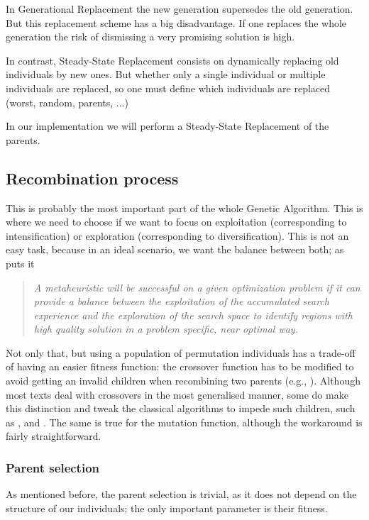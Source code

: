 In Generational Replacement the new generation supersedes the old generation. But this replacement scheme has a big disadvantage. If one replaces the whole generation the risk of dismissing a very promising solution is high.

In contrast, Steady-State Replacement consists on dynamically replacing old individuals by new ones. But whether only a single individual or multiple individuals are replaced,  so one must define which individuals are replaced (worst, random, parents, ...)

\bigskip
In our implementation we will perform a Steady-State Replacement of the parents.

\subsection{Recombination process}\label{sec:recombination}
This is probably the most important part of the whole Genetic Algorithm. This is where we need to choose if we want to focus on exploitation (corresponding to intensification) or exploration (corresponding to diversification). This is not an easy task, because in an ideal scenario, we want the balance between both; as \textcite{Stutzle1999} puts it
\begin{quotation}
	\emph{A metaheuristic will be successful on a given optimization problem if it can provide a balance between the exploitation of the accumulated search experience and the exploration of the search space to identify regions with high quality solution in a problem specific, near optimal way.}
\end{quotation}

Not only that, but using a population of permutation individuals has a trade-off of having an easier fitness function: the crossover function has to be modified to avoid getting an invalid children when recombining two parents (e.g., \inline{[1 1 0 3]}). Although most texts deal with crossovers in the most generalised manner, some do make this distinction and tweak the classical algorithms to impede such children, such as \textcite{Gendreau2010}, and \textcite{Goldberg1989}. The same is true for the mutation function, although the workaround is fairly straightforward.

\subsubsection*{Parent selection}%
As mentioned before, the parent selection is trivial, as it does not depend on the structure of our individuals; the only important parameter is their fitness.

